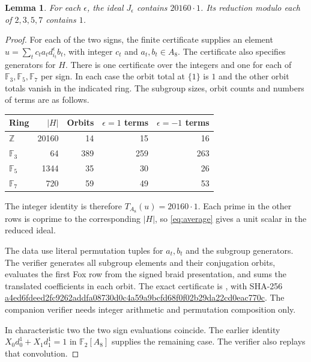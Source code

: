 \documentclass[11pt]{article}
\newtheorem{lemma}[theorem]{Lemma}
\newcommand{\Z}{\mathbb Z}
\newcommand{\F}{\mathbb F}
\begin{document}
\begin{lemma}\label{lem:certificates}
For each $\epsilon$, the ideal $J_\epsilon$ contains $20160\cdot1$.
Its reduction modulo each of $2,3,5,7$ contains $1$.
\end{lemma}
\begin{proof}
For each of the two signs, the finite certificate supplies an element
$u=\sum_t c_t a_t d_{i_t}^\epsilon b_t$, with integer $c_t$ and
$a_t,b_t\in A_8$. The certificate also specifies generators for $H$.
There is one certificate over the integers and one for each of
$\F_3,\F_5,\F_7$ per sign. In each case the orbit total at $\{1\}$
is $1$ and the other orbit totals vanish in the indicated ring.
The subgroup sizes, orbit counts and numbers of terms are as follows.
\begin{center}
\begin{tabular}{lrrrr}
\toprule
Ring & $|H|$ & Orbits & $\epsilon=1$ terms & $\epsilon=-1$ terms\\
\midrule
$\Z$ & 20160 & 14 & 15 & 16\\
$\F_3$ & 64 & 389 & 259 & 263\\
$\F_5$ & 1344 & 35 & 30 & 26\\
$\F_7$ & 720 & 59 & 49 & 53\\
\bottomrule
\end{tabular}
\end{center}
The integer identity is therefore $T_{A_8}(u)=20160\cdot1$.
Each prime in the other rows is coprime to the corresponding
$|H|$, so \eqref{eq:average} gives a unit scalar in the reduced ideal.

The data use literal permutation tuples for $a_t,b_t$ and the subgroup
generators. The verifier generates all subgroup elements and their
conjugation orbits, evaluates the first Fox row from the signed braid
presentation, and sums the translated coefficients in each orbit.
The exact certificate is ,
with SHA-256
\url{a4ed6fdeed2fc9262addfa08730d0c4a59a9bcfd68f0f02b29da22cd0eac770c}.
The companion verifier needs integer arithmetic and permutation
composition only.

In characteristic two the two sign evaluations coincide. The earlier
identity $X_0d_0^1+X_1d_1^1=1$ in $\F_2[A_8]$
\cite[Theorem~3]{fox} supplies the remaining case.
The verifier also replays that convolution.
\end{proof}
\end{document}
